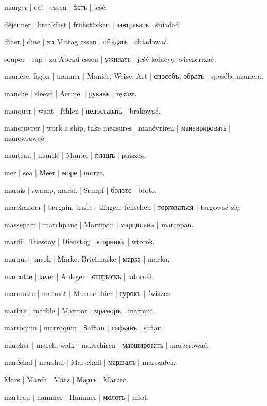\begin{outdent}{1em}
manger | eat | essen | ѣсть | jeść.

\uvsubentry{}
déjeuner | breakfast | frühstücken | завтракать | śniadać.


\uvsubentry{}
dîner | dine | zu Mittag essen | обѣдать | obiadować.


\uvsubentry{}
souper | sup | zu Abend essen | ужинать | jeść kolacyę, wieczerrzać.

manière, façon | manner | Manier, Weise, Art | способъ, образъ | sposób, maniera.

manche | sleeve | Aermel | рукавъ | rękaw.

manquer | want | fehlen | недоставать | brakować.

manœuvrer | work a ship, take measures | manövriren | маневрировать | manewrować.

manteau | mantle | Mantel | плащъ | plaszcz.

mer | sea | Meer | море | morze.

marais | swamp, marsh | Sumpf | болото | błoto.

marchander | bargain, trade | dingen, feilschen | торговаться | targować się.

massepain | marchpane | Marzipan | марципанъ | marcepan.

mardi | Tuesday | Dienstag | вторникъ | wterek.

marque | mark | Marke, Briefmarke | марка | marka.

marcotte | layer | Ableger | отпрыскъ | latorośl.

marmotte | marmot | Murmelthier | сурокъ | świszcz.

marbre | marble | Marmor | мраморъ | marmur.

marroquin | marroquin | Saffian | сафьянъ | safian.

marcher | march, walk | marschiren | маршировать | marzerować.

maréchal | marshal | Marschall | маршалъ | marszałek.

Mars | March | März | Мартъ | Marzec.

marteau | hammer | Hammer | молотъ | młot.


\end{outdent}

